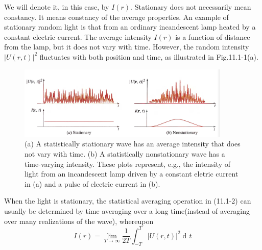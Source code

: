 \documentclass{article}
\numberwithin{figure}{subsection}
\numberwithin{table}{subsection}
\DeclareMathOperator\dif{d\!}
\begin{document}
We will denote it, in this case, by $ I(r) $. Stationary does not necessarily mean constancy. It means constancy of the average properties. An example of stationary random light is that from an ordinary incandescent lamp heated by a constant electric current. The average intensity $ I(r) $ is a function of distance from the lamp, but it does not vary with time. However, the random intensity $ \lvert U(r,t) \rvert ^2 $ fluctuates with both position and time, as illustrated in Fig.11.1-1(a).
\begin{figure}[ht]
\centering
\includegraphics[width=0.9\textwidth]{11_1_1.PNG}
\caption{(a) A statistically stationary wave has an average intensity that does not vary with time. (b) A statistically nonstationary wave has a time-varying intensity. These plots represent, e.g., the intensity of light  from an incandescent lamp driven by a constant eletric current in (a) and a pulse of electric current in (b).}
\label{fig: 11_1_1}
\end{figure}
\par When the light is stationary, the statistical averaging operation in (11.1-2)  can usually be determined by time averaging over a long time(instead of averaging over many realizations of the wave), whereupon
\begin{equation}
I(r) = \lim_{T\to\infty}\frac{1}{2T} \int_{-T}^T \lvert U(r,t) \rvert ^2 \dif t
\end{equation}

\bigbreak\begingroup
\color{ksc}
\end{document}
